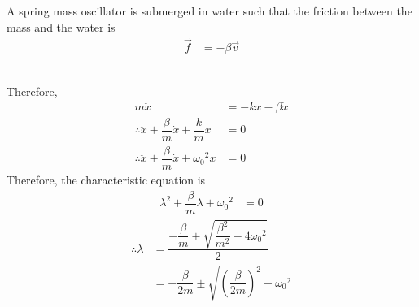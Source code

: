 \documentclass[fleqn, a4paper, 12pt]{article}
\theoremstyle{definition}
\theoremstyle{theorem}
\begin{document}
A spring mass oscillator is submerged in water such that the friction between the mass and the water is
\begin{align*}
	\overrightarrow{f} &= - \beta \overrightarrow{v}
\end{align*}\\
Therefore, 
\begin{align*}
	m \ddot{x} &= - k x - \beta \dot{x}\\
	\therefore \ddot{x} + \dfrac{\beta}{m} \dot{x} + \dfrac{k}{m} x &= 0\\
	\therefore \ddot{x} + \dfrac{\beta}{m} \dot{x} + {\omega_0}^2 x &= 0	
\end{align*}
Therefore, the characteristic equation is
\begin{align*}
	\lambda^2 + \dfrac{\beta}{m} \lambda + {\omega_0}^2 &= 0
\end{align*}
\begin{align*}
	\therefore \lambda &= \dfrac{-\dfrac{\beta}{m} \pm \sqrt{\dfrac{\beta^2}{m^2} - 4 {\omega_0}^2}}{2}\\
	&= -\dfrac{\beta}{2m} \pm \sqrt{\left( \dfrac{\beta}{2m} \right)^2 - {\omega_0}^2}
\end{align*}
\end{document}

